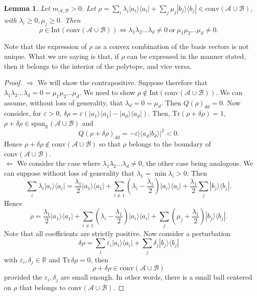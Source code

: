 \documentclass[a4paper, notitlepage, 11pt]{article}
\numberwithin{equation}{section}
\newcommand{\Acal}{{\mathcal A}}
\newcommand{\Bcal}{{\mathcal B}}
\newcommand{\spanRAB}{{\mathrm{span}_{\R}(\Acal\cup\Bcal)}}
\newcommand{\R}{\mathbb{R}}
\newcommand{\mab}{m_{\Acal,\Bcal}}
\newcommand{\Tr}{\mathrm{Tr}\,}
\newcommand{\conv}[1]{\mathrm{conv}\left(#1\right)}
\newcommand{\convAB}{\conv{\Acal \cup \Bcal}}
\renewcommand{\epsilon}{\varepsilon}
\newtheorem{Lemma}[Theorem]{Lemma}
\begin{document}
\begin{Lemma}
Let $\mab>0$. Let $\rho=\sum_i \lambda_i |a_i\rangle\langle a_i|+ \sum_j \mu_j |b_j\rangle\langle b_j|\in\convAB$, with $\lambda_i\geq0, \mu_j\geq 0$. Then 
\begin{equation}
\rho\in\mathrm{Int}\left(\convAB\right)\Leftrightarrow\lambda_1\lambda_2\dots\lambda_d\not=0\ \textrm{or}\ \mu_1\mu_2\dots\mu_d\not=0.
\end{equation}
\end{Lemma}
Note that the expression of $\rho$ as a convex combination of the basis vectors is not unique. What we are saying is that, if $\rho$ can be expressed in the manner stated, then it belongs to the interior of the polytope, and vice versa. 
\begin{proof} $\Rightarrow$ We will show the contrapositive. Suppose therefore that $\lambda_1\lambda_2\dots\lambda_d=0= \mu_1\mu_2\dots\mu_d$. We need to show $\rho\not\in \mathrm{Int}(\convAB)$. We can assume, without loss of generality, that $\lambda_d=0=\mu_d$.  Then $Q(\rho)_{dd}=0.$  Now consider, for $\epsilon>0$, $\delta\rho=\epsilon(|a_1\rangle\langle a_1|-|a_d\rangle\langle a_d|)$. 
Then, $\mathrm{Tr}(\rho+\delta\rho) = 1$, $\rho+\delta\rho\in\spanRAB$
and
$$
Q(\rho+\delta\rho)_{dd}=-\epsilon|\langle a_d|b_d\rangle|^2<0.
$$
Hence $\rho+\delta\rho\not\in\convAB$ so that $\rho$ belongs to the boundary of $\convAB$.\\
$\Leftarrow$
We consider the case where $\lambda_1\lambda_2\dots\lambda_d\not=0$, the other case being analogous. We can suppose without loss of generality that $\lambda_1=\min \lambda_i>0$. Then
$$
\sum_i\lambda_i|a_i\rangle\langle a_i|=
\frac{\lambda_1}{2}|a_1\rangle\langle a_1|+
\sum_{i\not=1}(\lambda_i-\frac{\lambda_1}{2})|a_i\rangle\langle a_i| 
+\frac{\lambda_1}{2}\sum_j |b_j\rangle\langle b_j|.
$$
Hence
$$
\rho= \frac{\lambda_1}{2}|a_1\rangle\langle a_1|+
\sum_{i\not=1}(\lambda_i-\frac{\lambda_1}{2})|a_i\rangle\langle a_i| 
+\sum_j(\mu_j+\frac{\lambda_1}{2}) |b_j\rangle\langle b_j|.
$$
Note that all coefficients are strictly positive.
Now consider a perturbation
$$
\delta\rho=\sum_i\epsilon_i|a_i\rangle\langle a_i|+\sum_j \delta_j |b_j\rangle\langle b_j|
$$
with $\epsilon_i, \delta_j\in\R$ and $\Tr\delta\rho=0$, then 
$$
\rho +\delta\rho \in \convAB
$$
provided the $\epsilon_i, \delta_j$ are small enough. 
In other words, there is a small ball centered on $\rho$ that belongs to $\convAB$.
\end{proof}
\end{document}
